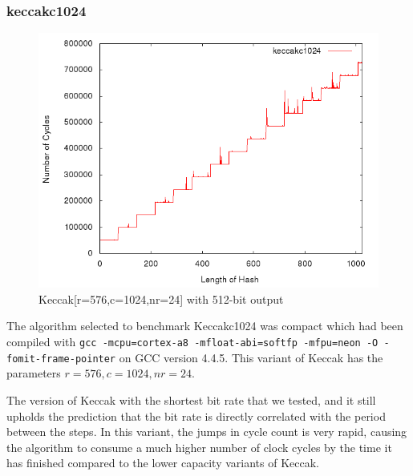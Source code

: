 \subsubsection{keccakc1024}
\begin{figure}[H]
    \begin{center}
        \includegraphics[scale=0.5]{images/keccakc1024.png} 
        \caption{Keccak[r=576,c=1024,nr=24] with 512-bit output}
    \end{center}
\end{figure}

The algorithm selected to benchmark Keccakc1024 was compact which had been
compiled with \texttt{gcc -mcpu=cortex-a8 -mfloat-abi=softfp -mfpu=neon -O
-fomit-frame-pointer} on GCC version 4.4.5. This variant of Keccak has the
parameters $r=576,c=1024,nr=24$.

The version of Keccak with the shortest bit rate that we tested, and it still
upholds the prediction that the bit rate is directly correlated with the period
between the steps. In this variant, the jumps in cycle count is very rapid,
causing the algorithm to consume a much higher number of clock cycles by the
time it has finished compared to the lower capacity variants of Keccak.
